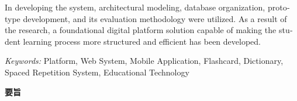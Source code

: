 \begin{english}
In developing the system, architectural modeling, database organization, prototype development, and its evaluation methodology were utilized. As a result of the research, a foundational digital platform solution capable of making the student learning process more structured and efficient has been developed.

\vspace{3mm}
\textit{Keywords:} Platform, Web System, Mobile Application, Flashcard, Dictionary, Spaced Repetition System, Educational Technology
\end{english}

\vspace{10mm}
\newpage
\begin{center}
\textbf{\Large\japanesefontsf 要旨}
\end{center}

